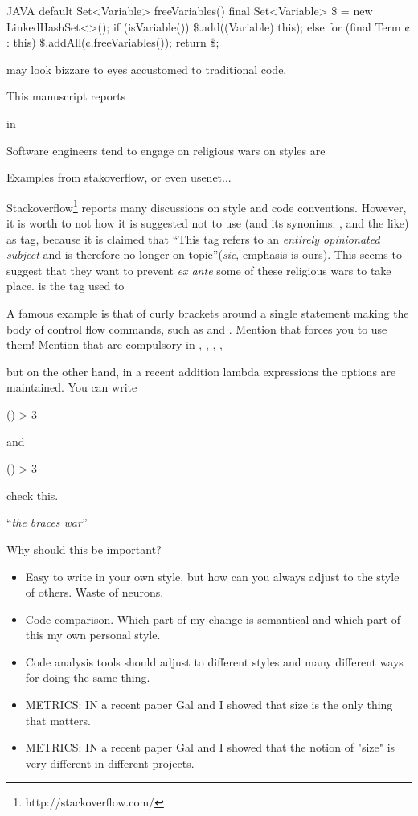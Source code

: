 \begin{code}{JAVA}
default Set<Variable> freeVariables() {
    final Set<Variable> \$ = new LinkedHashSet<>();
    if (isVariable())
      \$.add((Variable) this);
    else
      for (final Term ¢ : this)
        \$.addAll(¢.freeVariables());
    return \$;
  }
\end{code}



  
may look bizzare to eyes accustomed to traditional \Java code.


This manuscript reports 

in 

\Java
Software engineers tend to engage  on religious wars on styles are

Examples from stakoverflow, or even usenet... 

Stackoverflow\footnote{http://stackoverflow.com/} reports many discussions on style and code conventions. 
However, it is worth to not how it is suggested not to use  (and its synonims: , 
 and the like) as tag, because it is claimed that 
``This tag refers to an \emph{entirely opinionated subject} and is therefore no longer on-topic''(\emph{sic}, 
emphasis is ours). 
This seems to suggest that they want to prevent \emph{ex ante} some of these religious wars to take place.
 is the tag used to 

A famous example is that of curly brackets around a single statement making
the body of control flow commands, such as  and 
.
Mention that \Go forces you to use them!
Mention that are compulsory in , 
,  
,  
,  

but on the other hand, in a recent addition lambda expressions\cite{lambda}
the options are maintained.
You can write
\begin{JAVA}
()-> 3
\end{JAVA}
and
\begin{JAVA}
  ()-> {3}
\end{JAVA}
check this.

``\emph{the braces war}''


Why should this be important?
\begin{itemize}
    \item Easy to write in  your own style, but how can 
      you always adjust to the style of others.
      Waste of neurons.
    \item Code comparison. Which part of my change is semantical and which 
      part of this my own personal style.
    \item Code analysis tools should adjust to different styles and many
        different ways for doing the same thing.
    \item METRICS: IN a recent paper Gal and I showed that size 
      is the only thing that matters.
    \item METRICS: IN a recent paper Gal and I showed that the notion of 
      "size" is very different in different projects.
\end{itemize}

